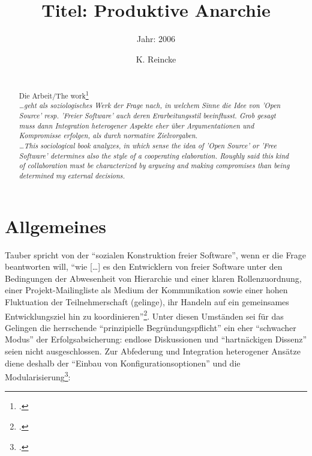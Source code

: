 \documentclass[DIV=calc,BCOR=5mm,11pt,headings=small,oneside,abstract=true, toc=bib]{scrartcl}
\begin{document}

\titlehead{Literaturexzerpt}
\subject{Autor(en): Niels C. Taubert}
\title{Titel: Produktive Anarchie}
\subtitle{Jahr: 2006 }
\author{K. Reincke}
\maketitle

\begin{abstract}
\noindent
\cite[(ist:)][]{Taubert2006a} \\
Die Arbeit/The work\footcite[][]{Taubert2006a} \\
\noindent \itshape
\ldots geht als soziologisches Werk der Frage nach, in welchem Sinne die Idee
von 'Open Source' resp. 'Freier Software' auch deren Erarbeitungsstil beeinflusst.
Grob gesagt muss dann Integration heterogener Aspekte eher über Argumentationen
und Kompromisse erfolgen, als durch normative Zielvorgaben.
\\
\noindent
\ldots This sociological book analyzes, in which sense the idea of 'Open Source'
or 'Free Software' determines also the style of a cooperating elaboration.
Roughly said this kind of collaboration must be characterized by argueing and
making compromises than being determined my external decisions.
\end{abstract}
\footnotesize
\normalsize

\section{Allgemeines}

Tauber spricht von der \enquote{sozialen Konstruktion freier Software}, wenn
er die Frage beantworten will, \enquote{wie [\ldots] es den Entwicklern von freier
Software unter den Bedingungen der Abwesenheit von Hierarchie und einer klaren
Rollenzuordnung, einer Projekt-Mailingliste als Medium der Kommunikation sowie
einer hohen Fluktuation der Teilnehmerschaft (gelinge), ihr Handeln auf ein
gemeinsames Entwicklungsziel hin zu
koordinieren}\footcite[cf.][205]{Taubert2006a}. Unter diesen Umständen
sei für das Gelingen die herrschende \enquote{prinzipielle
Begründungspflicht} ein eher \enquote{schwacher Modus} der
Erfolgsabsicherung: endlose Diskussionen und \enquote{hartnäckigen Dissenz}
seien nicht ausgeschlossen. Zur Abfederung und Integration heterogener Ansätze
diene deshalb der \enquote{Einbau von Konfigurationsoptionen} und die
Modularisierung\footcite[cf.][206]{Taubert2006a}:
\end{document}
